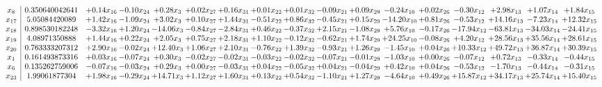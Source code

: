 \documentclass[9pt]{article}
\begin{document}
 \[\begin{array}{c| c c@{\hskip 2pt} c@{\hskip 2pt} c@{\hskip 2pt} c@{\hskip 2pt} c@{\hskip 2pt} c@{\hskip 2pt} c@{\hskip 2pt} c@{\hskip 2pt} c@{\hskip 2pt} c@{\hskip 2pt} c@{\hskip 2pt} c@{\hskip 2pt} c@{\hskip 2pt} c@{\hskip 2pt} c@{\hskip 2pt} }
 x_{8}   &  0.350640042641 & +  0.14 x_{16} & -0.10 x_{24} & +  0.28 x_{3} & +  0.02 x_{27} & +  0.16 x_{31} & +  0.01 x_{22} & +  0.01 x_{32} & -0.09 x_{21} & +  0.09 x_{29} & -0.24 x_{10} & +  0.02 x_{26} & -0.30 x_{12} & +  2.98 x_{13} & +  1.07 x_{14} & +  1.84 x_{15}\\
 x_{17}   &  5.05084420089 & +  1.42 x_{16} & -1.09 x_{24} & +  3.02 x_{3} & +  0.10 x_{27} & +  1.44 x_{31} & -0.51 x_{22} & +  0.86 x_{32} & -0.45 x_{21} & +  0.15 x_{29} & -14.20 x_{10} & +  0.81 x_{26} & -0.53 x_{12} & + 14.16 x_{13} & -7.23 x_{14} & + 12.32 x_{15}\\
 x_{18}   &  0.898530182248 & -3.32 x_{16} & +  1.20 x_{24} & -14.06 x_{3} & -0.84 x_{27} & -2.84 x_{31} & +  0.46 x_{22} & -0.37 x_{32} & +  2.15 x_{21} & -1.08 x_{29} & +  5.76 x_{10} & -0.17 x_{26} & -17.94 x_{12} & -63.81 x_{13} & -34.03 x_{14} & -24.41 x_{15}\\
 x_{19}   &  4.08971350888 & +  1.44 x_{16} & +  0.22 x_{24} & +  2.05 x_{3} & +  0.75 x_{27} & +  2.18 x_{31} & +  1.10 x_{22} & -0.12 x_{32} & -0.62 x_{21} & +  1.74 x_{29} & + 24.25 x_{10} & -0.08 x_{26} & +  4.20 x_{12} & + 28.56 x_{13} & + 35.56 x_{14} & + 28.61 x_{15}\\
 x_{20}   &  0.763333207312 & +  2.90 x_{16} & -0.02 x_{24} & + 12.40 x_{3} & +  1.06 x_{27} & +  2.10 x_{31} & -0.76 x_{22} & +  1.39 x_{32} & -0.93 x_{21} & +  1.26 x_{29} & -1.45 x_{10} & +  0.04 x_{26} & + 10.33 x_{12} & + 49.72 x_{13} & + 36.87 x_{14} & + 30.39 x_{15}\\
 x_{1}   &  0.161493873316 & +  0.03 x_{16} & -0.07 x_{24} & +  0.30 x_{3} & -0.02 x_{27} & -0.02 x_{31} & -0.03 x_{22} & -0.02 x_{32} & -0.07 x_{21} & -0.01 x_{29} & -1.03 x_{10} & +  0.00 x_{26} & -0.07 x_{12} & +  0.72 x_{13} & -0.33 x_{14} & -0.44 x_{15}\\
 x_{6}   &  0.135262759006 & -0.07 x_{16} & -0.03 x_{24} & +  0.29 x_{3} & +  0.00 x_{27} & -0.03 x_{31} & +  0.04 x_{22} & -0.05 x_{32} & +  0.04 x_{21} & -0.04 x_{29} & +  0.42 x_{10} & +  0.04 x_{26} & -0.53 x_{12} & -1.70 x_{13} & -0.44 x_{14} & -0.31 x_{15}\\
 x_{23}   &  1.99061877304 & +  1.98 x_{16} & -0.29 x_{24} & + 14.71 x_{3} & +  1.12 x_{27} & +  1.60 x_{31} & +  0.13 x_{22} & +  0.54 x_{32} & -1.10 x_{21} & +  1.27 x_{29} & -4.64 x_{10} & +  0.49 x_{26} & + 15.87 x_{12} & + 34.17 x_{13} & + 25.74 x_{14} & + 15.40 x_{15}\\

\end{array}\]
\end{document}
